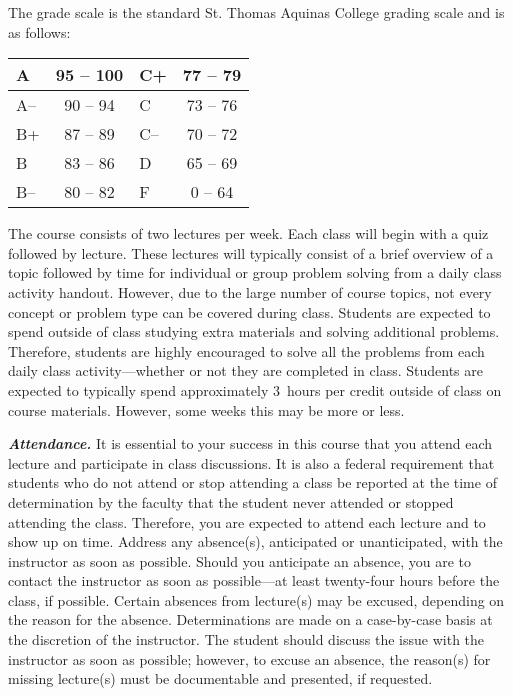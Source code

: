 \documentclass[11pt,letterpaper]{article}
\begin{document}
The grade scale is the standard St. Thomas Aquinas College grading scale and is as follows: \par
        \begin{table}[!ht]
        \centering
        \begin{tabular}{|l||c|l||c|} \hline
        A & 95 -- 100 & C+ & 77 -- 79 \\ \hline
        A-- & 90 -- 94 & C & 73 -- 76 \\ \hline
        B+ & 87 -- 89 & C-- & 70 -- 72 \\ \hline
        B & 83 -- 86 & D & 65 -- 69 \\ \hline
        B-- & 80 -- 82 & F & 0 -- 64 \\ \hline
        \end{tabular}
        \end{table}
\sectionbreak



The course consists of two lectures per week. Each class will begin with a quiz followed by lecture. These lectures will typically consist of a brief overview of a topic followed by time for individual or group problem solving from a daily class activity handout. However, due to the large number of course topics, not every concept or problem type can be covered during class. Students are expected to spend outside of class studying extra materials and solving additional problems. Therefore, students are highly encouraged to solve all the problems from each daily class activity---whether or not they are completed in class. Students are expected to typically spend approximately 3~hours per credit outside of class on course materials. However, some weeks this may be more or less. \sectionbreak



{\itshape\bfseries\color{stacred}Attendance.} It is essential to your success in this course that you attend each lecture and participate in class discussions. It is also a federal requirement that students who do not attend or stop attending a class be reported at the time of determination by the faculty that the student never attended or stopped attending the class. Therefore, you are expected to attend each lecture and to show up on time. Address any absence(s), anticipated or unanticipated, with the instructor as soon as possible. Should you anticipate an absence, you are to contact the instructor as soon as possible---at least twenty-four hours before the class, if possible.  Certain absences from lecture(s) may be excused, depending on the reason for the absence. Determinations are made on a case-by-case basis at the discretion of the instructor. The student should discuss the issue with the instructor as soon as possible; however, to excuse an absence, the reason(s) for missing lecture(s) must be documentable and presented, if requested. \pspace
\end{document}

